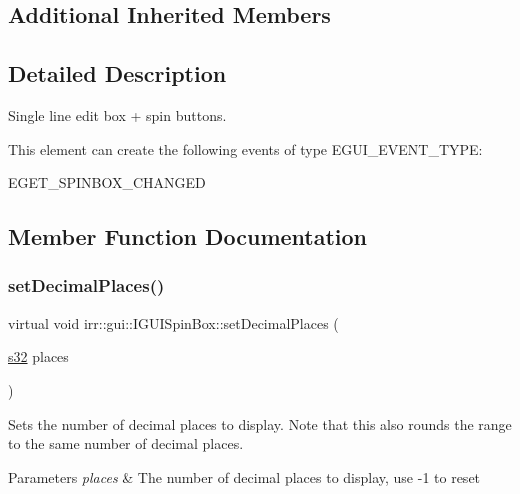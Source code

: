 \subsection*{Additional Inherited Members}


\subsection{Detailed Description}
Single line edit box + spin buttons. 

\begin{DoxyParagraph}{This element can create the following events of type E\+G\+U\+I\+\_\+\+E\+V\+E\+N\+T\+\_\+\+T\+Y\+PE\+:}
\begin{DoxyItemize}
\item E\+G\+E\+T\+\_\+\+S\+P\+I\+N\+B\+O\+X\+\_\+\+C\+H\+A\+N\+G\+ED \end{DoxyItemize}

\end{DoxyParagraph}


\subsection{Member Function Documentation}
\mbox{\label{classirr_1_1gui_1_1IGUISpinBox_a8a335d32cbdb7f43ca814422f8cee098}} 
\subsubsection{\texorpdfstring{set\+Decimal\+Places()}{setDecimalPlaces()}}
{\footnotesize\ttfamily virtual void irr\+::gui\+::\+I\+G\+U\+I\+Spin\+Box\+::set\+Decimal\+Places (\begin{DoxyParamCaption}\item[{\hyperlink{namespaceirr_ac66849b7a6ed16e30ebede579f9b47c6}{s32}}]{places }\end{DoxyParamCaption})\hspace{0.3cm}{\ttfamily [pure virtual]}}



Sets the number of decimal places to display. Note that this also rounds the range to the same number of decimal places. 


\begin{DoxyParams}{Parameters}
{\em places} & The number of decimal places to display, use -\/1 to reset \\
\hline
\end{DoxyParams}
\mbox{\label{classirr_1_1gui_1_1IGUISpinBox_af7bc07a7be30d16a6ff27750782aaa80}} 
